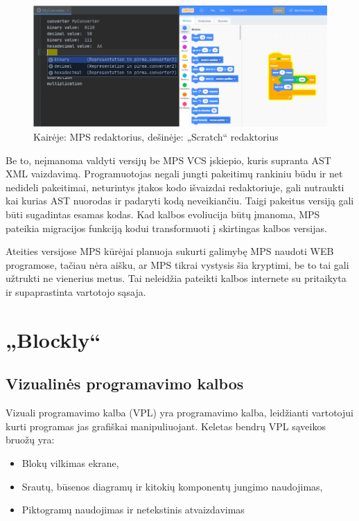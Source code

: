 \documentclass{VUMIFPSkursinis}
\begin{document}
\begin{figure}[H]
    \centering
    \includegraphics[scale=0.6]{img/editors.png}
    \caption{Kairėje: MPS redaktorius, dešinėje: „Scratch“ redaktorius }
    \label{img:editors}
\end{figure}

Be to, neįmanoma valdyti versijų be MPS VCS įskiepio, kuris supranta AST XML vaizdavimą. Programuotojas negali jungti pakeitimų rankiniu būdu ir net nedideli pakeitimai, neturintys įtakos kodo išvaizdai redaktoriuje, gali nutraukti kai kurias AST nuorodas ir padaryti kodą neveikiančiu. Taigi pakeitus versiją gali būti sugadintas esamas kodas. Kad kalbos evoliucija būtų įmanoma, MPS pateikia migracijos funkciją kodui transformuoti į skirtingas kalbos versijas.

Ateities versijose MPS kūrėjai planuoja sukurti galimybę MPS naudoti WEB programose, tačiau nėra aišku, ar MPS tikrai vystysis šia kryptimi, be to tai gali užtrukti ne vienerius metus. Tai neleidžia pateikti kalbos internete su pritaikyta ir supaprastinta vartotojo sąsaja.\cite{klimevs2016domain} 

\section{„Blockly“}

\subsection{Vizualinės programavimo kalbos}

Vizuali programavimo kalba (VPL) yra programavimo kalba, leidžianti vartotojui kurti programas jas grafiškai manipuliuojant.
Keletas bendrų VPL sąveikos bruožų yra:
\begin{itemize}
    \item Blokų vilkimas ekrane,
    \item Srautų, būsenos diagramų ir kitokių komponentų jungimo naudojimas,
    \item Piktogramų naudojimas ir netekstinis atvaizdavimas
\end{itemize}
\end{document}
